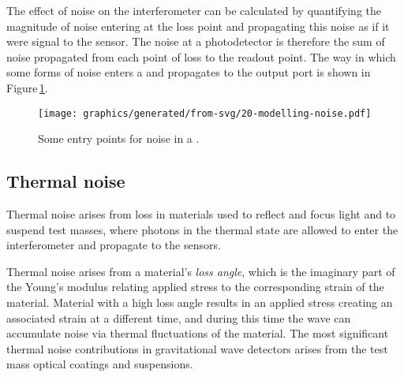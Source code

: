 The effect of noise on the interferometer can be calculated by quantifying the magnitude of noise entering at the loss point and propagating this noise as if it were signal to the sensor. The noise at a photodetector is therefore the sum of noise propagated from each point of loss to the readout point. The way in which some forms of noise enters a \DRFPMI{} and propagates to the output port is shown in Figure\,\ref{fig:modelling-noise}.

\begin{figure}
  \centering
  \texttt{[image: graphics/generated/from-svg/20-modelling-noise.pdf]}
  \caption[Some entry points for noise in a \DRFPMI{}]{\label{fig:modelling-noise}Some entry points for noise in a \DRFPMI{}. }
\end{figure}

\subsection{Thermal noise}
Thermal noise arises from loss in materials used to reflect and focus light and to suspend test masses, where photons in the thermal state are allowed to enter the interferometer and propagate to the sensors.

Thermal noise arises from a material's \emph{loss angle}, which is the imaginary part of the Young's modulus relating applied stress to the corresponding strain of the material. Material with a high loss angle results in an applied stress creating an associated strain at a different time, and during this time the wave can accumulate noise via thermal fluctuations of the material. The most significant thermal noise contributions in gravitational wave detectors arises from the test mass optical coatings and suspensions.

